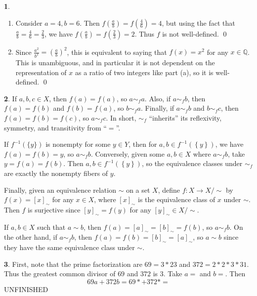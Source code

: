 \documentclass[12pt]{article}
\theoremstyle{definition}
\newtheorem{ex}{}
\begin{document}
\begin{ex}\
	\begin{enumerate}[label=(\alph*)]
		\item Consider $a=4, b=6$.
		      Then $f\left(\frac{a}{b}\right) = f\left(\frac{4}{6}\right) = 4$, but using the fact that $\frac{a}{b} = \frac{4}{6} = \frac{2}{3}$, we have $f\left(\frac{a}{b}\right) = f\left(\frac{2}{3}\right) = 2$.
		      Thus $f$ is not well-defined.
		      \qed
		\item Since $\frac{a^2}{b^2} = \left( \frac{a}{b} \right)^2$, this is equivalent to saying that $f(x) = x^2$ for any $x \in \mathbb{Q}$.
		      This is unambiguous, and in particular it is not dependent on the representation of $x$ as a ratio of two integers like part (a), so it is well-defined.
		      \qed
	\end{enumerate}
\end{ex}

\begin{ex}
	If $a, b, c \in X$, then $f(a) = f(a)$, so $a \sim_f a$.
	Also, if $a \sim_f b$, then $f(a) = f(b)$ and $f(b) = f(a)$, so $b \sim_f a$.
	Finally, if $a \sim_f b$ and $b \sim_f c$, then $f(a) = f(b) = f(c)$, so $a \sim_f c$.
	In short, $\sim_f$ ``inherits'' its reflexivity, symmetry, and transitivity from ``$=$''.

	If $f^{-1}(\lbrace y \rbrace)$ is nonempty for some $y \in Y$, then for $a, b \in f^{-1}(\left\lbrace y \right\rbrace)$, we have $f(a) = f(b) = y$, so $a \sim_f b$.
	Conversely, given some $a, b \in X$ where $a \sim_f b$, take $y = f(a) = f(b)$.
	Then $a, b \in f^{-1}(\left\lbrace y \right\rbrace)$, so the equivalence classes under $\sim_f$ are exactly the nonempty fibers of $y$.

	Finally, given an equivalence relation $\sim$ on a set $X$, define $f: X \to X/\sim$ by $f(x) = [x]_\sim$ for any $x \in X$, where $[x]_\sim$ is the equivalence class of $x$ under $\sim$.
	Then $f$ is surjective since $[y]_\sim = f(y)$ for any $[y]_\sim \in X/\sim$.

	If $a, b \in X$ such that $a \sim b$, then $f(a) = [a]_\sim = [b]_\sim = f(b)$, so $a \sim_f b$.
	On the other hand, if $a \sim_f b$, then $f(a) = f(b) = [b]_\sim = [a]_\sim$, so $a \sim b$ since they have the same equivalence class under $\sim$.
\end{ex}

\begin{ex}
	First, note that the prime factorization are $69 = 3 * 23$ and $372 = 2 * 2 * 3 * 31$.
	Thus the greatest common divisor of $69$ and $372$ is $3$.
	Take $a = $ and $b = $.
	Then \begin{equation*}
		69a + 372b = 69 * + 372 * =
	\end{equation*}
	UNFINISHED
\end{ex}
\end{document}
